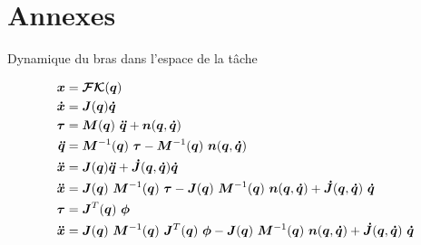 \appendix

\section{Annexes}

\begin{frame}{Dynamique du bras dans l'espace de la tâche}
    \begin{small}
        \begin{align}
            \x   & = \fk(\q) \\
            \dx  & = \jacobian(\q)\dq \\
            \vt  & = \ms{M}(\q) ~ \ddq + \vs{n}(\q, \dq) \\
            \ddq & = \ms{M}^{-1}(\q) ~ \vt - \ms{M}^{-1}( \q ) ~ \vs{n}( \q, \dq ) \\
            \ddx & = \jacobian(\q) \ddq + \djacobian(\q, \dq) \dq \\
            \ddx & = \jacobian(\q) ~ \ms{M}^{-1}(\q) ~ \vt - \jacobian(\q) ~ \ms{M}^{-1}(\q) ~ \vs{n}( \q, \dq ) + \djacobian(\q, \dq) ~ \dq \\
            \vt  & = \jacobian^T(\q) ~ \octrl \\
            \ddx & = \jacobian(\q) ~ \ms{M}^{-1}(\q) ~ \jacobian^T(\q) ~ \octrl - \jacobian(\q) ~ \ms{M}^{-1}(\q) ~ \vs{n}( \q, \dq ) + \djacobian(\q, \dq) ~ \dq
        \end{align}
    \end{small}
\end{frame}


